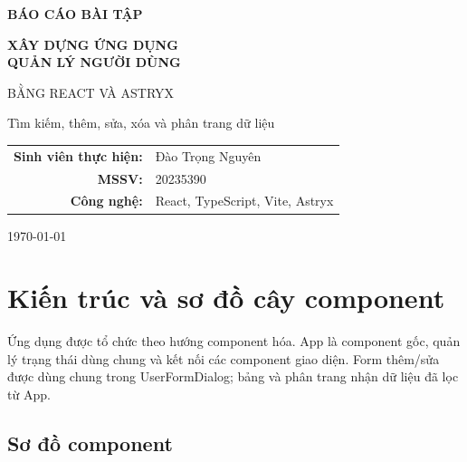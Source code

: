 \documentclass[12pt,a4paper]{article}
\newcommand{\code}[1]{\textsf{\small #1}}
\begin{document}
\color{Ink}

\hypersetup{pageanchor=false}
\begin{titlepage}
  \centering
  \vspace*{2.2cm}
  {\Large\bfseries BÁO CÁO BÀI TẬP\par}
  \vspace{1.4cm}
  {\LARGE\bfseries XÂY DỰNG ỨNG DỤNG\\QUẢN LÝ NGƯỜI DÙNG\par}
  \vspace{0.35cm}
  {\Large BẰNG REACT VÀ ASTRYX\par}
  \vspace{0.5cm}
  {\large Tìm kiếm, thêm, sửa, xóa và phân trang dữ liệu\par}
  \vspace{2.2cm}
  \begin{tabular}{rl}
    \textbf{Sinh viên thực hiện:} & Đào Trọng Nguyên \\
    \textbf{MSSV:} & 20235390 \\
    \textbf{Công nghệ:} & React, TypeScript, Vite, Astryx \\
  \end{tabular}
  \vfill
  {\large \today\par}
\end{titlepage}
\hypersetup{pageanchor=true}


\section{Kiến trúc và sơ đồ cây component}

Ứng dụng được tổ chức theo hướng component hóa. \code{App} là component gốc, quản lý trạng thái dùng chung và kết nối các component giao diện. Form thêm/sửa được dùng chung trong \code{UserFormDialog}; bảng và phân trang nhận dữ liệu đã lọc từ \code{App}.

\subsection{Sơ đồ component}
\end{document}
